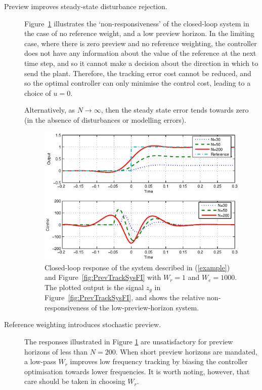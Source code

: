 \begin{description}
\item[Preview improves steady-state disturbance rejection.] 
Figure~\ref{fig:BetterSSWithIncN} illustrates the `non-responsiveness' of the closed-loop system in the case of no reference weight, and a low preview horizon. In the limiting case, where there is zero preview and no reference weighting, the controller does not have any information about the value of the reference at the next time step, and so it cannot make a decision about the direction in which to send the plant. Therefore, the tracking error cost cannot be reduced, and so the optimal controller can only minimise the control cost, leading to a choice of $u=0$.

Alternatively, as $N\rightarrow \infty$, then the steady state error tends towards zero (in the absence of disturbances or modelling errors). 
\begin{figure}
\includegraphics[width=\columnwidth]{./diags/BetterSSwithIncN.eps}
\caption{Closed-loop response of the system described in (\ref{example}) and Figure~\ref{fig:PrevTrackSysFI} with $W_r=1$ and $W_e=1000$.
The plotted output is the signal $z_g$ in Figure~\ref{fig:PrevTrackSysFI}, and shows the relative non-responsiveness of the low-preview-horizon system.
\label{fig:BetterSSWithIncN}}
\end{figure}
\item[Reference weighting introduces stochastic preview.] 
The responses illustrated in Figure \ref{fig:BetterSSWithIncN} are unsatisfactory for preview horizons of less than $N=200$. When short preview horizons are mandated, a low-pass $W_r$ improves low frequency tracking by biasing the controller optimisation towards lower frequencies. It is worth noting, however, that care should be taken in choosing $W_r$.

\end{description}
